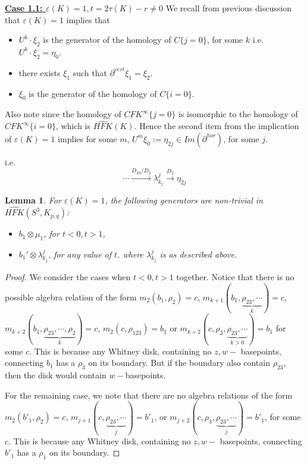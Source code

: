 \documentclass[11pt,reqno]{amsart}
\newtheorem {lemma}[theorem]{Lemma}
\theoremstyle{definition}
\newtheorem *{remark}{Remark}
\newcommand{\hfkhat}{\widehat{\mathit{HFK}}}
\begin{document}
\begin{subsection}{\underline{\textbf{Case 1.1: $\varepsilon(K)=1, t = 2 \tau(K) - r \neq 0$}}}
We recall from previous discussion that $\varepsilon(K) = 1$ implies that 
\begin{itemize}
    \item $U^{k}\cdot \xi_2$ is the generator of the homology of $C\{j=0\}$, for some $k$ i.e. $U^k\cdot \xi_2 = \eta_0$. 
    \item there exists $\xi_1$ such that $\partial^{vert} \xi_1 = \xi_2.$ 
    \item $\xi_0$ is the generator of the homology of $C\{i=0\}$.
 \end{itemize}



 Also note since the homology of $CFK^{\infty}\{j=0\}$ is isomorphic to the homology of $CFK^{\infty}\{i=0\}$, which is $\hfkhat(K)$. Hence the second item from the implication of $\varepsilon(K) = 1$ implies for some $m$, $U^m \xi_0:= \eta_{2j} \in Im(\partial^{hor})$, for some $j$. 

 i.e. \[\cdots \xrightarrow{D_{23}/ D_3} \lambda^j_{k_j} \xrightarrow{D_2} \eta_{2j} \]


\begin{lemma} \label{epsilon1}
For $\varepsilon(K) = 1$, the following generators are non-trivial in $\hfkhat(S^3, K_{p,q})$:
\begin{itemize}
    \item $b_1 \otimes \mu_1$, for $t < 0, t>1$,
    \item $b_1' \otimes \lambda^j_{k_j}$, for any value of $t$.
    where $\lambda^j_{k_j}$ is as described above.
\end{itemize}

\end{lemma}


\begin{proof}

We consider the cases when $t<0, t>1$ together. Notice that there is no possible algebra relation of the form $m_2(b_1, \rho_2) = c$, $m_{k+1}(b_1, \underbrace{\rho_{23},\cdots}_k) = c$, $m_{k+2}(b_1, \underbrace{\rho_{23},\cdots, \rho_2}_k) = c$, $m_2(c, \rho_{123})=b_1$ or $m_{k+2}(c, \rho_3, \underbrace{\rho_{23}, \cdots}_{k>0}) = b_1$ for some $c$. This is because any Whitney disk, containing no $z, w-$ basepoints, connecting $b_1$ has a $\rho_3$ on its boundary. But if the boundary also contain $\rho_{23}$, then the disk would contain $w-$basepoints. 


For the remaining case, we note that there are no algebra relations of the form $m_2(b'_1, \rho_2)= c$, $m_{j+1}(c, \underbrace{\rho_{23}, \cdots}_j) = b'_1$, or $m_{j+2}(c, \rho_3, \underbrace{\rho_{23}, \cdots}_j )=b'_1$, for some $c$. This is because any Whitney disk, containing no $z, w-$ basepoints, connecting $b'_1$ has a $\rho_1$ on its boundary. 
\end{proof}






\end{subsection}
\end{document}
